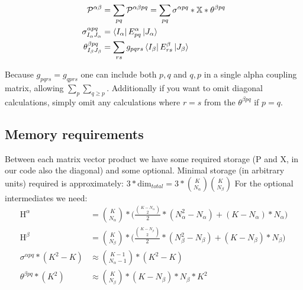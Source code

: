 \begin{align}
\mathcal{P}^{\alpha \beta} & = \sum_{pq}  \mathcal{P}^{\alpha \beta pq} = \sum_{pq} \sigma^{\alpha pq} * \mathbb{X} * \theta^{\beta pq} \\
\sigma^{\alpha pq}_{I_\alpha J_\alpha} & =\bra{I_\alpha} E^{\alpha}_{pq} \ket{J_\alpha} \\
\theta^{\beta pq}_{I_\beta J_\beta} &  = \sum_{rs} g_{pqrs} \bra{I_\beta} E^{\beta}_{rs} \ket{J_\beta}
\end{align}

Because $g_{pqrs} = g_{qprs}$ one can include both $p,q$ and $q,p$ in a single alpha coupling matrix, allowing $\sum_p \sum_{q \geq p}$. Additionally if you want to omit diagonal calculations, simply omit any calculations where $r=s$ from the $\theta^{\beta pq}$ if $p=q$.

\subsection{Memory requirements}

Between each matrix vector product we have some required storage (P and X, in our code also the diagonal) and some optional.
Minimal storage (in arbitrary units) required is approximately: $3 * \text{dim}_{total} = 3 * \binom{K}{N_\alpha}\binom{K}{N_\beta}$
For the optional intermediates we need:
\begin{align}
  \text{H}^{\alpha} &= \binom{K}{N_\alpha} * \big(\frac{\binom{K-N_\alpha}{2}}{2} * (N_{\alpha}^2-N_\alpha) + (K-N_\alpha)*N_\alpha \big) \\
  \text{H}^{\beta} &= \binom{K}{N_\beta} * \big(\frac{\binom{K-N_\beta}{2}}{2} * (N_{\beta}^2-N_\beta) + (K-N_\beta)*N_\beta \big) \\
  \sigma^{\alpha pq} * (K^2 - K) & \approx \binom{K-1}{N_\alpha-1} * (K^2 - K) \\
  \theta^{\beta pq} * (K^2) & \approx \binom{K}{N_\beta} * (K-N_\beta)*N_\beta * K^2
\end{align}

